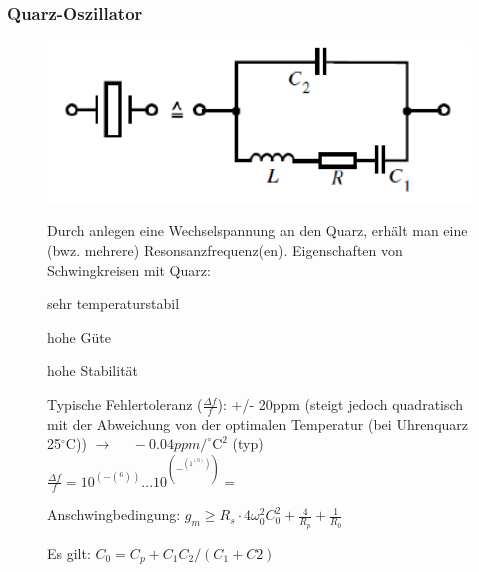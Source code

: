 \subsubsection{Quarz-Oszillator}
\begin{figure}[h!]
	\begin{minipage}{0.3\textwidth} 
	\includegraphics[width=1\textwidth]{images/Ersatzschaltbild_Schwingquarz}
	\end{minipage}
	\begin{minipage}{0.6\textwidth}
	   Durch anlegen eine Wechselspannung an den Quarz, erhält man eine (bwz. mehrere) Resonsanzfrequenz(en).
       Eigenschaften von Schwingkreisen mit Quarz:
      \begin{compactitem}
        \item sehr temperaturstabil
        \item hohe Güte
        \item hohe Stabilität
        \item Typische Fehlertoleranz ($\frac{\Delta f}{f}$): +/- 20ppm (steigt jedoch quadratisch mit der Abweichung von der optimalen Temperatur (bei Uhrenquarz 25$^\circ$C)) $\rightarrow$ $\quad-0.04ppm/^\circ \text{C}^2$ (typ)\\
        $\frac{\Delta f}{f}=10^(-(^6))...10^(-^(1^(0)))=$
        \item Anschwingbedingung: $g_m \geq R_s\cdot4\omega_0^2C_0 ^2+\frac{4}{R_p}+\frac{1}{R_0}$
        \begin{compactitem}
          \item Es gilt: $ C_0 = C_p+C_1C_2/(C_1+C2)$
        \end{compactitem} 
      \end{compactitem} 
	\end{minipage}
	\begin{minipage}{0.3\textwidth} 

\end{minipage}
\end{figure}
